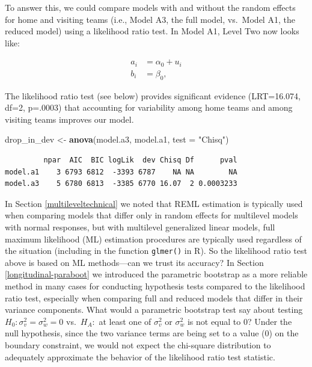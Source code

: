 \documentclass[
]{krantz}
\newenvironment{Shaded}{\begin{snugshade}}{\end{snugshade}}
\newcommand{\DataTypeTok}[1]{\textcolor[rgb]{0.27,0.27,0.27}{#1}}
\newcommand{\KeywordTok}[1]{\textcolor[rgb]{0.27,0.27,0.27}{\textbf{#1}}}
\newcommand{\NormalTok}[1]{#1}
\newcommand{\StringTok}[1]{\textcolor[rgb]{0.5,0.5,0.5}{#1}}
\begin{document}
To answer this, we could compare models with and without the random effects for home and visiting teams (i.e., Model A3, the full model, vs.~Model A1, the reduced model) using a likelihood ratio test. In Model A1, Level Two now looks like:

\begin{align*}
a_{i} & = \alpha_{0}+u_{i} \\
b_{i} & = \beta_{0},
\end{align*}

The likelihood ratio test (see below) provides significant evidence (LRT=16.074, df=2, p=.0003) that accounting for variability among home teams and among visiting teams improves our model.

\begin{Shaded}
\begin{Highlighting}[]
\NormalTok{drop_in_dev <-}\StringTok{ }\KeywordTok{anova}\NormalTok{(model.a3, model.a1, }\DataTypeTok{test =} \StringTok{"Chisq"}\NormalTok{)}
\end{Highlighting}
\end{Shaded}

\begin{verbatim}
         npar  AIC  BIC logLik  dev Chisq Df      pval
model.a1    3 6793 6812  -3393 6787    NA NA        NA
model.a3    5 6780 6813  -3385 6770 16.07  2 0.0003233
\end{verbatim}

In Section \ref{multileveltechnical} we noted that REML estimation is typically used when comparing models that differ only in random effects for multilevel models with normal responses, but with multilevel generalized linear models, full maximum likelihood (ML) estimation procedures are typically used regardless of the situation (including in the function \texttt{glmer()} in R). So the likelihood ratio test above is based on ML methods---can we trust its accuracy? In Section \ref{longitudinal-paraboot} we introduced the parametric bootstrap  as a more reliable method in many cases for conducting hypothesis tests compared to the likelihood ratio test, especially when comparing full and reduced models that differ in their variance components. What would a parametric bootstrap test say about testing \(H_{0}: \sigma_{v}^{2}=\sigma_{w}^{2}=0\) vs.~\(H_{A}:\) at least one of \(\sigma_{v}^{2}\) or \(\sigma_{w}^{2}\) is not equal to 0? Under the null hypothesis, since the two variance terms are being set to a value (0) on the boundary constraint, we would not expect the chi-square distribution to adequately approximate the behavior of the likelihood ratio test statistic.
\end{document}
